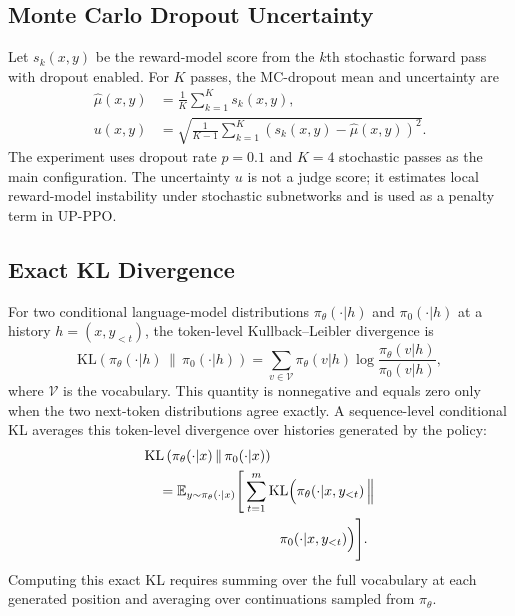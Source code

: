 \documentclass[twocolumn,10pt]{article}
\newcommand{\kl}{\mathrm{KL}}
\begin{document}
\subsection{Monte Carlo Dropout Uncertainty}
Let $s_k(x,y)$ be the reward-model score from the $k$th stochastic forward pass with dropout enabled. For $K$ passes, the MC-dropout mean and uncertainty are
\begin{align}
    \hat{\mu}(x,y)&=\frac{1}{K}\sum_{k=1}^{K}s_k(x,y),\\
    u(x,y)&=\sqrt{\frac{1}{K-1}\sum_{k=1}^{K}\left(s_k(x,y)-\hat{\mu}(x,y)\right)^2}.
\end{align}
The experiment uses dropout rate $p=0.1$ and $K=4$ stochastic passes as the main configuration. The uncertainty $u$ is not a judge score; it estimates local reward-model instability under stochastic subnetworks and is used as a penalty term in UP-PPO.

\subsection{Exact KL Divergence}
For two conditional language-model distributions $\pi_\theta(\cdot|h)$ and $\pi_0(\cdot|h)$ at a history $h=(x,y_{<t})$, the token-level Kullback--Leibler divergence is
\begin{equation}
    \kl\left(\pi_\theta(\cdot|h)\,\|\,\pi_0(\cdot|h)\right)
    =\sum_{v\in\mathcal{V}}\pi_\theta(v|h)
    \log\frac{\pi_\theta(v|h)}{\pi_0(v|h)},
\end{equation}
where $\mathcal{V}$ is the vocabulary. This quantity is nonnegative and equals zero only when the two next-token distributions agree exactly. A sequence-level conditional KL averages this token-level divergence over histories generated by the policy:
\begin{equation}
\begin{aligned}
    &\kl\left(\pi_\theta(\cdot|x)\,\|\,\pi_0(\cdot|x)\right) \\
    &\quad =\mathbb{E}_{y\sim\pi_\theta(\cdot|x)}
    \Bigg[\sum_{t=1}^{m}
    \kl\Big(\pi_\theta(\cdot|x,y_{<t})\,\Big\| \\
    &\hspace{34mm} \pi_0(\cdot|x,y_{<t})\Big)\Bigg].
\end{aligned}
\end{equation}
Computing this exact KL requires summing over the full vocabulary at each generated position and averaging over continuations sampled from $\pi_\theta$.
\end{document}
